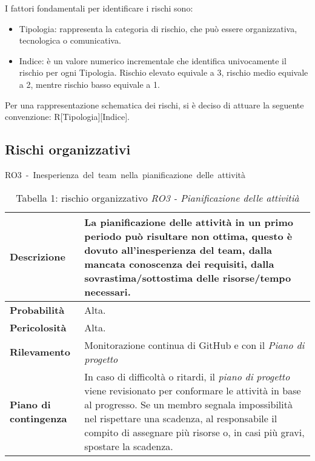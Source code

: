 \documentclass[italian,12pt]{article} %
\begin{document}
I fattori fondamentali per identificare i rischi sono:
\begin{itemize}
    \item Tipologia: rappresenta la categoria di rischio, che può essere organizzativa, tecnologica o comunicativa.
    \item Indice: è un valore numerico incrementale che identifica univocamente il rischio per ogni Tipologia. Rischio elevato equivale a 3, rischio medio equivale a 2, mentre rischio basso equivale a 1.
\end{itemize}
Per una rappresentazione schematica dei rischi, si è deciso di attuare la seguente convenzione: R[Tipologia][Indice].

\begin{table}[!h]
    \subsection{Rischi organizzativi}
    \centering
    \hbox{RO3 - Inesperienza del team nella pianificazione delle attività}
    \vspace{0.3cm}
	\begin{tabular}{|l|p{10cm}|} 
		\hline
		\textbf{Descrizione} & La pianificazione delle attività in un primo periodo può risultare non ottima, questo è dovuto all'inesperienza del team, dalla mancata conoscenza dei requisiti, dalla sovrastima/sottostima delle risorse/tempo necessari.\\ 
        \hline
        \textbf{Probabilità} & Alta. \\
        \hline
        \textbf{Pericolosità} & Alta. \\
        \hline
        \textbf{Rilevamento} & Monitorazione continua di GitHub e con il \textit{Piano di progetto} \\
        \hline
        \textbf{Piano di contingenza} & In caso di difficoltà o ritardi, il \textit{piano di progetto} viene revisionato per conformare le attività in base al progresso. Se un membro segnala impossibilità nel rispettare una scadenza, al responsabile il compito di assegnare più risorse o, in casi più gravi, spostare la scadenza. \\
		\hline
	\end{tabular}
    \caption{Tabella 1: rischio organizzativo \textit{RO3 - Pianificazione delle attivitià}}
\end{table}
\end{document}
